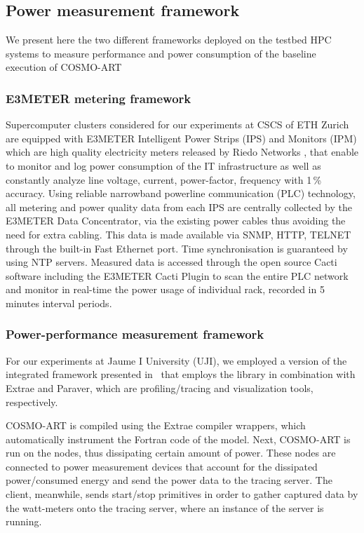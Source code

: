 \subsection{Power measurement framework}
\label{subsec:3.3}

We present here the two different  frameworks deployed on the testbed HPC systems to
measure  performance and  power  consumption of the baseline execution of COSMO-ART

\subsubsection{E3METER metering framework}

Supercomputer  clusters considered  for our  experiments at CSCS of ETH Zurich are equipped with
E3METER Intelligent  Power Strips (IPS)  and Monitors (IPM)  which are
high   quality   electricity  meters   released   by  Riedo   Networks
\citep{Riedonetworks},   that  enable   to  monitor   and   log  power
consumption  of the IT  infrastructure as  well as  constantly analyze
line  voltage,  current, power-factor,  frequency  with 1\,\%  accuracy.
Using  reliable narrowband  powerline communication  (PLC) technology,
all  metering and  power  quality  data from  each  IPS are  centrally
collected  by the E3METER  Data Concentrator,  via the  existing power
cables thus  avoiding the need for  extra cabling.  This  data is made
available via  SNMP, HTTP, TELNET  through the built-in  Fast Ethernet
port.   Time  synchronisation  is  guaranteed by  using  NTP  servers.
Measured  data is  accessed  through the  open  source Cacti  software
including the E3METER Cacti Plugin  to scan the entire PLC network and
monitor in real-time the power usage of individual rack, recorded in 5
minutes interval periods.

\subsubsection{Power-performance measurement framework}

For our experiments at Jaume I University (UJI), we employed a version
of the integrated framework presented in~\cite{energy13} that employs the \pmlib library in
combination with Extrae and Paraver, which  are profiling/tracing and
visualization tools, respectively.

\textsc{COSMO-ART}  is compiled  using the  Extrae  compiler wrappers,
which automatically  instrument the Fortran code of  the model.  Next,
\textsc{COSMO-ART}  is  run on  the  nodes,  thus dissipating  certain
amount  of power.   These  nodes are  connected  to power  measurement
devices that account for the dissipated power/consumed energy and send
the power  data to the  tracing server.  The client,  meanwhile, sends
start/stop  primitives  in  order  to  gather  captured  data  by  the
watt-meters onto the  tracing server, where an instance  of the \pmlib
server is running.

